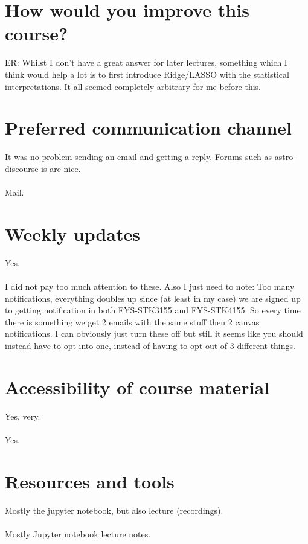 \documentclass[12pt]{article}
\begin{document}
	\vspace{2cm}
	
	\section*{How would you improve this course?}
	\noindent
	ER: Whilst I don't have a great answer for later lectures, something which I think would help a lot is to first introduce Ridge/LASSO with the statistical interpretations. It all seemed completely arbitrary for me before this.
	
	\vspace{2cm}
	
	\section*{Preferred communication channel}
	\noindent
	It was no problem sending an email and getting a reply. Forums such as astro-discourse is are nice. 
	\\\\
	Mail.
	\vspace{2cm}
	
	\section*{Weekly updates}
	\noindent
	Yes. 
	\\\\
	I did not pay too much attention to these. Also I just need to note: Too many notifications, everything doubles up since (at least in my case) we are signed up to getting notification in both FYS-STK3155 and FYS-STK4155. So every time there is something we get 2 emails with the same stuff then 2 canvas notifications. I can obviously just turn these off but still it seems like you should instead have to opt into one, instead of having to opt out of 3 different things.
	
	\vspace{2cm}
	
	\section*{Accessibility of course material}
	\noindent
	Yes, very.
	\\\\
	Yes.
	
	\vspace{2cm}
	
	\section*{Resources and tools}
	\noindent
	Mostly the jupyter notebook, but also lecture (recordings).
	\\\\
	Mostly Jupyter notebook lecture notes.
	
\end{document}
